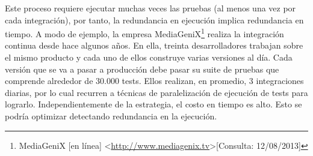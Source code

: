 \par Este proceso requiere ejecutar muchas veces las pruebas (al menos una vez por cada integración), por tanto, la redundancia en ejecución implica redundancia en tiempo. A modo de ejemplo, la empresa MediaGeniX\footnote{MediaGeniX [en línea] \textless\url{http://www.mediagenix.tv}\textgreater [Consulta: 12/08/2013]} realiza la integración continua desde hace algunos años. En ella, treinta desarrolladores trabajan sobre el mismo producto y cada uno de ellos construye varias versiones al día. Cada versión que se va a pasar a producción debe pasar su suite de pruebas que comprende alrededor de 30.000 tests. Ellos realizan, en promedio, 3 integraciones diarias, por lo cual recurren a técnicas de paralelización de ejecución de tests para lograrlo. Independientemente de la estrategia, el costo en tiempo es alto. Esto se podría optimizar detectando redundancia en la ejecución. \\

